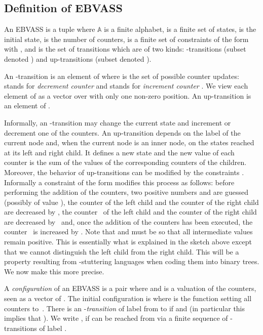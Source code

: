 \documentclass{CSML}
\newcommand\ebvass{\textup{EBVASS}\xspace}
\newcommand\A{\ensuremath{\mathbb{A}}\xspace}
\begin{document}
\subsection{Definition of \ebvass} 


An \ebvass is a tuple  
where \A is a finite alphabet,  is a finite set of states,  is the initial
state,  is the number of counters,  is a finite set of constraints of
the form with , and  is the set of transitions which are
of two kinds: -transitions (subset denoted ) and
up-transitions (subset denoted ).

An -transition is an element of 
where  is the set of possible counter
updates:  stands for \emph{decrement counter } and  stands for
\emph{increment counter }. We view each element of  as a vector over
 with only one non-zero position.
An up-transition is an element of .


Informally, an -transition may change the current state and increment
or decrement one of the counters. An up-transition depends on the label of the
current node and, when the current node is an inner node, on the states reached
at its left and right child.  It defines a new state and the new value of each
counter is the sum of the values of the corresponding counters of the children.
Moreover, the behavior of up-transitions can be modified by the constraints
. Informally a constraint of the form  modifies this
process as follows: before performing the addition of the counters, 
two positive numbers
 and  are guessed 
(possibly of value ), the counter  of the left child and the counter
 of the right child are decreased by , the counter~ of the left
child and the counter  of the right child are decreased by~ and, once
the addition of the counters has been executed, the counter~ is increased by
. Note that  and  must be so that all intermediate values
remain positive.  This is essentially what is explained in the sketch above
except that we cannot distinguish the left child from the right child. This
will be a property resulting from -stuttering languages when coding them into binary
trees.
We now make this more precise.

A \emph{configuration} of an \ebvass is a pair  where  
and  is a valuation of the counters, seen as a vector of . 
The initial configuration is  where  is the function setting all counters to~.
There is an -\emph{transition} of label  from  to  if
 and  
(in particular this implies that ). 
We write , if  can be reached from
 via a finite sequence of -transitions of label .
 
\end{document}
